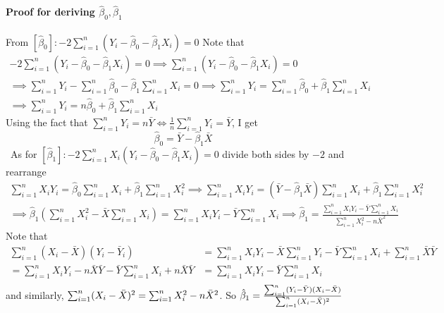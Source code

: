 \documentclass[12pt]{article}
\theoremstyle{definition}
\theoremstyle{property}
\theoremstyle{assumption}
\theoremstyle{example}
\theoremstyle{comment}
\begin{document}
\begin{mdframed}[backgroundcolor=blue!5] 
\textbf{Proof for deriving $\hat{\beta}_0,\hat{\beta}_1$}
\\ \\
\footnotesize{From $[\hat{\beta}_0]: -2\sum_{i=1}^n(Y_i-\hat{\beta}_0-\hat{\beta}_1X_i)=0$ Note that 
\begin{gather*}
-2\sum_{i=1}^n(Y_i-\hat{\beta}_0-\hat{\beta}_1X_i)=0 \implies \sum_{i=1}^n(Y_i-\hat{\beta}_0-\hat{\beta}_1X_i)=0 \\
\implies  \sum_{i=1}^n Y_i -\sum_{i=1}^n\hat{\beta}_0 -\hat{\beta}_1\sum_{i=1}^nX_i =0 \implies  \sum_{i=1}^n Y_i =\sum_{i=1}^n\hat{\beta}_0 +\hat{\beta}_1\sum_{i=1}^nX_i \\
\implies  \sum_{i=1}^n Y_i =n\hat{\beta}_0 +\hat{\beta}_1\sum_{i=1}^nX_i
\end{gather*}
Using the fact that $\sum_{i=1}^n Y_i = n\bar{Y} \iff \frac{1}{n}\sum_{i=1}^n Y_i = \bar{Y}$, I get
\[
\hat{\beta}_0=\bar{Y}-\hat{\beta}_1\bar{X}
\]\
As for $[\hat{\beta}_1]: -2\sum_{i=1}^nX_i(Y_i-\hat{\beta}_0-\hat{\beta}_1X_i)=0$ divide both sides by $-2$ and rearrange
\begin{gather*}
\sum_{i=1}^nX_iY_i=\hat{\beta}_0\sum_{i=1}^nX_i +\hat{\beta}_1\sum_{i=1}^nX_i^2\implies \sum_{i=1}^nX_iY_i=(\bar{Y}-\hat{\beta}_1\bar{X})\sum_{i=1}^nX_i +\hat{\beta}_1\sum_{i=1}^nX_i^2\\
\implies\hat{\beta}_1\left(\sum_{i=1}^nX_i^2-\bar{X}\sum_{i=1}^nX_i\right)=\sum_{i=1}^nX_iY_i-\bar{Y}\sum_{i=1}^nX_i
\implies \hat{\beta}_1 = \frac{\sum_{i=1}^nX_iY_i - \bar{Y}\sum_{i=1}^nX_i}{\sum_{i=1}^nX_i^2-n{\bar{X}}^2}
\end{gather*}
Note that 
\[
\begin{aligned}
\sum_{i=1}^n(X_i-\bar{X})(Y_i-\bar{Y}_i) &= \sum_{i=1}^nX_iY_i - \bar{X}\sum_{i=1}^nY_i -\bar{Y}\sum_{i=1}^nX_i +\sum_{i=1}^n\bar{X}\bar{Y} \\
=\sum_{i=1}^nX_iY_i - n\bar{X}\bar{Y} -\bar{Y}\sum_{i=1}^nX_i +n\bar{X}\bar{Y} &= \sum_{i=1}^nX_iY_i - \bar{Y}\sum_{i=1}^nX_i \\
 \end{aligned}
\]}\normalsize
and similarly, $\footnotesize{\sum_{i=1}^n(X_i-\bar{X})^2 = \sum_{i=1}^nX_i^2-n{\bar{X}}^2}\normalsize$. So $\footnotesize{
\hat{\beta}_1=\frac{\sum_{i=1}^n(Y_i-\bar{Y})(X_i-\bar{X})}{\sum_{i=1}^n(X_i-\bar{X})^2}
}$\normalsize
\end{mdframed}
\end{document}
